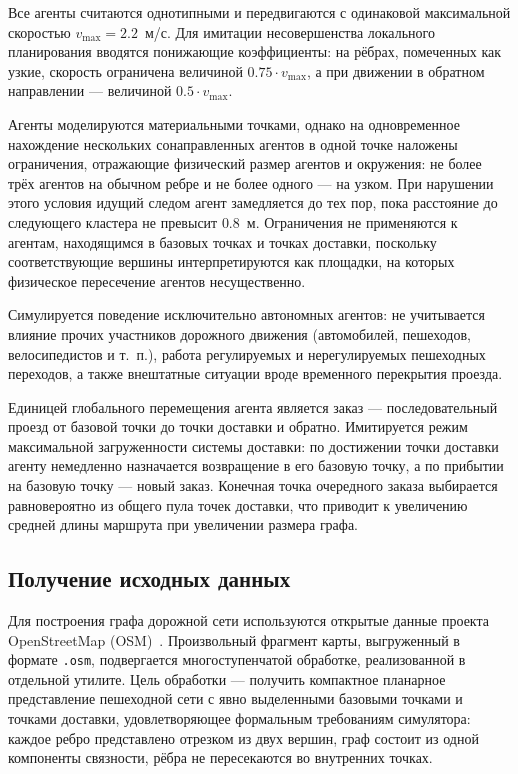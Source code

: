 Все агенты считаются однотипными и передвигаются с одинаковой максимальной скоростью
$v_{\mathrm{max}} = 2.2$~м/с. Для имитации несовершенства локального планирования вводятся
понижающие коэффициенты: на рёбрах, помеченных как узкие, скорость ограничена величиной
$0.75 \cdot v_{\mathrm{max}}$, а при движении в обратном направлении --- величиной
$0.5 \cdot v_{\mathrm{max}}$.

Агенты моделируются материальными точками, однако на одновременное нахождение нескольких
сонаправленных агентов в одной точке наложены ограничения, отражающие физический размер
агентов и окружения: не более трёх агентов на обычном ребре и не более одного --- на узком. При нарушении этого
условия идущий следом агент замедляется до тех пор, пока расстояние до следующего кластера не превысит
$0.8$~м. Ограничения не применяются к агентам, находящимся в базовых точках и точках
доставки, поскольку соответствующие вершины интерпретируются как площадки, на которых физическое
пересечение агентов несущественно.

Симулируется поведение исключительно автономных агентов: не учитывается влияние прочих участников
дорожного движения (автомобилей, пешеходов, велосипедистов и т.~п.), работа регулируемых и
нерегулируемых пешеходных переходов, а также внештатные ситуации вроде временного перекрытия
проезда.

Единицей глобального перемещения агента является заказ --- последовательный проезд от базовой точки до точки
доставки и обратно. Имитируется режим максимальной загруженности системы доставки: по достижении
точки доставки агенту немедленно назначается возвращение в его базовую точку, а по прибытии
на базовую точку --- новый заказ. Конечная точка
очередного заказа выбирается равновероятно из общего пула точек доставки, что приводит к увеличению 
средней длины маршрута при увеличении размера графа.

\subsection{Получение исходных данных} \label{sec:data}

Для построения графа дорожной сети используются открытые данные проекта OpenStreetMap (OSM)~\cite{osm}. 
Произвольный фрагмент карты, выгруженный в формате \texttt{.osm}, подвергается многоступенчатой обработке, 
реализованной в отдельной утилите. Цель обработки --- получить компактное планарное представление 
пешеходной сети с явно выделенными базовыми точками и точками доставки, удовлетворяющее формальным 
требованиям симулятора: каждое ребро представлено отрезком из двух вершин, граф состоит из одной 
компоненты связности, рёбра не пересекаются во внутренних точках.

